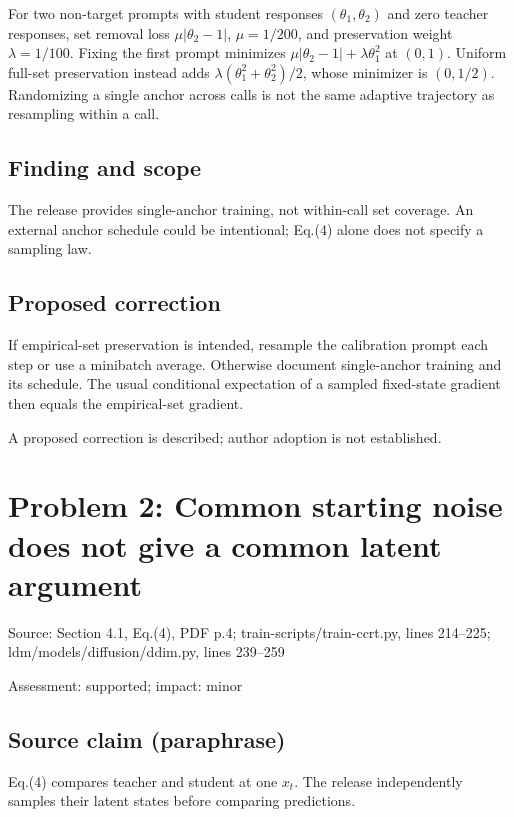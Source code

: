 \documentclass[11pt]{article}
\begin{document}
For two non-target prompts with student responses \((\theta_1,\theta_2)\) and zero teacher responses, set removal loss \(\mu|\theta_2-1|\), \(\mu=1/200\), and preservation weight \(\lambda=1/100\). Fixing the first prompt minimizes \(\mu|\theta_2-1|+\lambda\theta_1^2\) at \((0,1)\). Uniform full-set preservation instead adds \(\lambda(\theta_1^2+\theta_2^2)/2\), whose minimizer is \((0,1/2)\). Randomizing a single anchor across calls is not the same adaptive trajectory as resampling within a call.

\subsection*{Finding and scope}

The release provides single-anchor training, not within-call set coverage. An external anchor schedule could be intentional; Eq.(4) alone does not specify a sampling law.

\subsection*{Proposed correction}

If empirical-set preservation is intended, resample the calibration prompt each step or use a minibatch average. Otherwise document single-anchor training and its schedule. The usual conditional expectation of a sampled fixed-state gradient then equals the empirical-set gradient.

A proposed correction is described; author adoption is not established.

\section*{Problem 2: Common starting noise does not give a common latent argument}

Source: Section 4.1, Eq.(4), PDF p.4; train-scripts/train-ccrt.py, lines 214–225; ldm/models/diffusion/ddim.py, lines 239–259

Assessment: supported; impact: minor

\subsection*{Source claim (paraphrase)}

Eq.(4) compares teacher and student at one \(x_t\). The release independently samples their latent states before comparing predictions.
\end{document}
